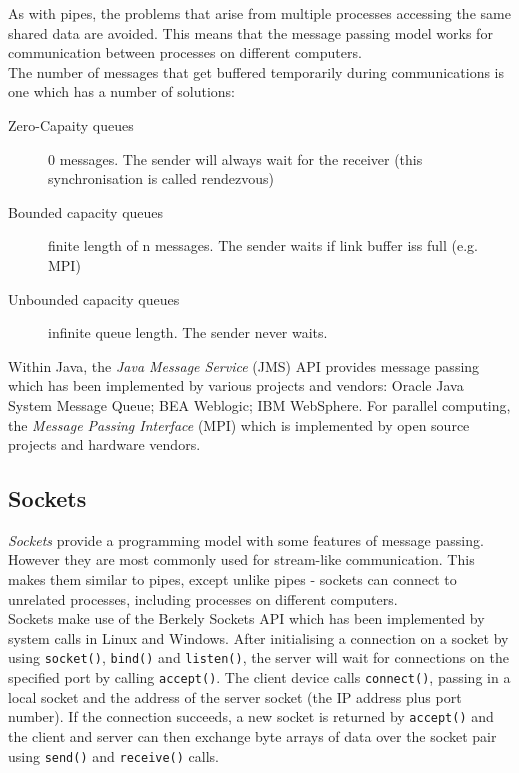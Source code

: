 As with pipes, the problems that arise from multiple processes accessing the same shared data are avoided. This means that the message passing model works for communication between processes on different computers.\\

The number of messages that get buffered temporarily during communications is one which has a number of solutions:
\begin{description}
    \item[Zero-Capaity queues] 0 messages. The sender will always wait for the receiver (this synchronisation is called rendezvous)
    \item[Bounded capacity queues] finite length of n messages. The sender waits if link buffer iss full (e.g. MPI) 
    \item[Unbounded capacity queues] infinite queue length. The sender never waits.  
\end{description}

Within Java, the \textit{Java Message Service} (JMS) API provides message passing which has been implemented by various projects and vendors: Oracle Java System Message Queue; BEA Weblogic; IBM WebSphere. For parallel computing, the \textit{Message Passing Interface} (MPI) which is implemented by open source projects and hardware vendors.

\subsection{Sockets}
\textit{Sockets} provide a programming model with some features of message passing. However they are most commonly used for stream-like communication. This makes them similar to pipes, except unlike pipes - sockets can connect to unrelated processes, including processes on different computers.\\

Sockets make use of the Berkely Sockets API which has been implemented by system calls in Linux and Windows. After initialising a connection on a socket by using \verb|socket()|, \verb|bind()| and \verb|listen()|, the server will wait for connections on the specified port by calling \verb|accept()|. The client device calls \verb|connect()|, passing in a local socket and the address of the server socket (the IP address plus port number). If the connection succeeds, a new socket is returned by \verb|accept()| and the client and server can then exchange byte arrays of data over the socket pair using \verb|send()| and \verb|receive()| calls.

